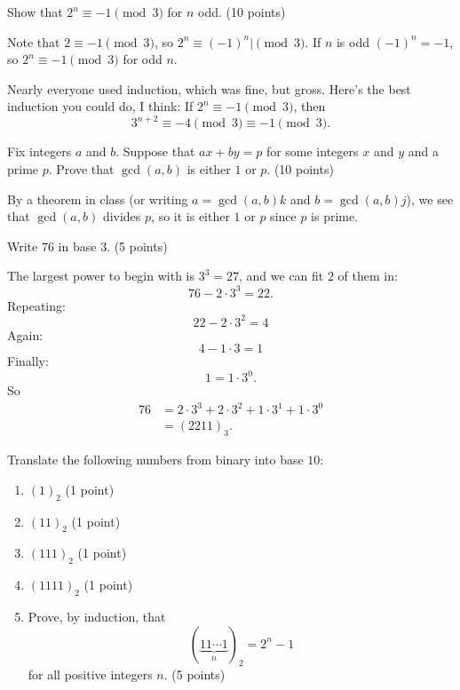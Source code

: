 \documentclass[12pt]{rudin}
\begin{document}
\begin{Exercise}
    Show that $2^n \equiv -1 \pmod{3}$ for $n$ odd. (10 points)
\end{Exercise}

\begin{Answer}
    Note that $2 \equiv -1 \pmod{3}$, so $2^n \equiv (-1)^n | \pmod{3}$. If $n$
    is odd $(-1)^n = -1$, so $2^n \equiv -1 \pmod{3}$ for odd $n$.

    Nearly everyone used induction, which was fine, but gross. Here's the best
    induction you could do, I think: If $2^n \equiv -1 \pmod{3}$, then
    \[
        3^{n + 2} \equiv -4 \pmod{3} \equiv -1 \pmod{3}.
    \]
\end{Answer}

\begin{Exercise}
    Fix integers $a$ and $b$. Suppose that $ax + by = p$ for some integers $x$
    and $y$ and a prime $p$. Prove that $\gcd(a, b)$ is either $1$ or $p$. (10 points)
\end{Exercise}

\begin{Answer}
    By a theorem in class (or writing $a = \gcd(a, b)k$ and $b = \gcd(a, b)j$),
    we see that $\gcd(a, b)$ divides $p$, so it is either $1$ or $p$ since $p$
    is prime.
\end{Answer}

\begin{Exercise}
    Write $76$ in base $3$. (5 points)
\end{Exercise}

\begin{Answer}
    The largest power to begin with is $3^3 = 27$, and we can fit $2$ of them in:
    \[
        76 - 2 \cdot 3^3 = 22.
    \]
    Repeating:
    \[
        22 - 2 \cdot 3^2 = 4
    \]
    Again:
    \[
        4 - 1 \cdot 3 = 1
    \]
    Finally:
    \[
        1 = 1 \cdot 3^0.
    \]
    So
    \begin{align*}
        76 &= 2 \cdot 3^3 + 2 \cdot 3^2 + 1 \cdot 3^1 + 1 \cdot 3^0 \\
           &= (2211)_3.
    \end{align*}
\end{Answer}

\begin{Exercise}
    Translate the following numbers from binary into base $10$:
    \begin{enumerate}[label=(\textbf{\alph*})]
        \item $(1)_2$ (1 point)
        \item $(11)_2$ (1 point)
        \item $(111)_2$ (1 point)
        \item $(1111)_2$ (1 point)
        \item Prove, by induction, that
        \[
            (\underbrace{11\cdots 1}_{n})_2 = 2^n - 1
        \]
        for all positive integers $n$. (5 points)
    \end{enumerate}
\end{Exercise}
\end{document}
